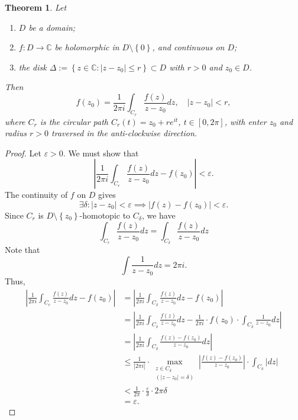 \documentclass[12pt,openany]{book}
\newtheorem{theorem}{Theorem}[chapter]
\theoremstyle{definition}
\newcommand{\set}[1]{\left\{#1\right\}}
\newcommand{\C}{\mathbb{C}}
\newcommand{\of}[1]{\left( #1 \right)}
\newcommand{\abs}[1]{\left\lvert #1 \right\rvert}
\begin{document}
	\begin{tcolorbox}[colback=white,colframe=thmcolor,arc=5pt,title={\color{white}\bf The Cauchy Integral Formula for Circular Paths}]
		\begin{theorem}
			Let \begin{enumerate}[(1)]
				\item $D$ be a domain;
				\item $f:D\to\C$ be holomorphic in $D\setminus\set{0}$, and continuous on $D$;
				\item the disk $\Delta:=\set{z\in\C:\abs{z-z_0}\leq r}\subset D$ with $r>0$ and $z_0\in D$.
			\end{enumerate} Then \[
			f\of{z_0}=\frac{1}{2\pi i}\int_{C_r}\frac{f\of{z}}{z-z_0}dz,\quad \abs{z-z_0}<r,
			\] where $C_r$ is the circular path $C_r\of{t}=z_0+re^{it}$, $t\in[0,2\pi]$, with enter $z_0$ and radius $r>0$ traversed in the anti-clockwise direction.
		\end{theorem}
	\end{tcolorbox}
	\begin{proof}
		Let $\varepsilon>0$. We must show that \[
		\abs{\frac{1}{2\pi i}\int_{C_r}\frac{f\of{z}}{z-z_0}dz-f\of{z_0}}<\varepsilon.
		\] The continuity of $f$ on $D$ gives \[
		\exists\delta:\abs{z-z_0}<\varepsilon\implies\abs{f\of{z}-f\of{z_0}}<\varepsilon.
		\] Since $C_r$ is $D\setminus\set{z_0}$-homotopic to $C_\delta$, we have \[
		\int_{C_r}\frac{f\of{z}}{z-z_0}dz=\int_{C_\delta}\frac{f\of{z}}{z-z_0}dz
		\] Note that \[
		\int\frac{1}{z-z_0}dz=2\pi i.
		\] Thus, \begin{align*}
			\abs{\frac{1}{2\pi i}\int_{C_r}\frac{f\of{z}}{z-z_0}dz-f\of{z_0}}&=
			\abs{\frac{1}{2\pi i}\int_{C_\delta}\frac{f\of{z}}{z-z_0}dz-f\of{z_0}}\\
			&=\abs{\frac{1}{2\pi i}\int_{C_\delta}\frac{f\of{z}}{z-z_0}dz-\frac{1}{2\pi i}\cdot f\of{z_0}\cdot\int_{C_\delta}\frac{1}{z-z_0}dz}\\
			&=\abs{\frac{1}{2\pi i}\int_{C_\delta}\frac{f\of{z}-f\of{z_0}}{z-z_0}dz}\\
			&\leq\frac{1}{\abs{2\pi i}}\cdot\max_{\substack{z\in C_\delta\\ (\abs{z-z_0}=\delta)}}\abs{\frac{f\of{z}-f\of{z_0}}{z-z_0}}\cdot\int_{C_\delta}\abs{dz}\\
			&<\frac{1}{2\pi}\cdot\frac{\varepsilon}{\delta}\cdot 2\pi\delta\\
			&=\varepsilon.
		\end{align*}
	\end{proof}
	
\end{document}
